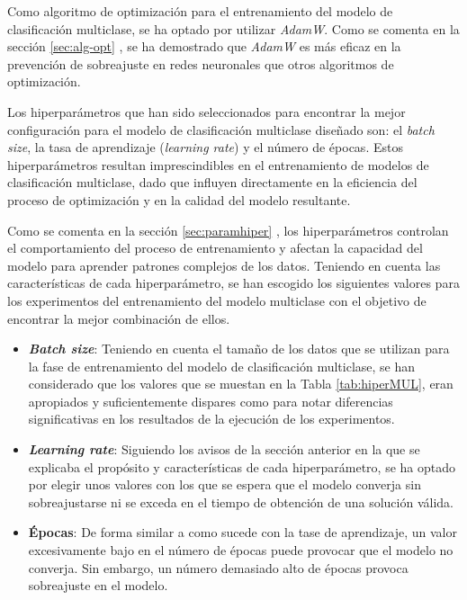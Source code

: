 Como algoritmo de optimización para el entrenamiento del modelo de clasificación multiclase, se ha optado por utilizar \textit{AdamW}. Como se comenta en la sección \ref{sec:alg-opt} , se ha demostrado que \textit{AdamW} es más eficaz en la prevención de sobreajuste en redes neuronales que otros algoritmos de optimización.

Los hiperparámetros que han sido seleccionados para encontrar la mejor configuración para el modelo de clasificación multiclase diseñado son: el \textit{batch size}, la tasa de aprendizaje (\textit{learning rate}) y el número de épocas. Estos hiperparámetros resultan imprescindibles en el entrenamiento de modelos de clasificación multiclase, dado que influyen directamente en la eficiencia del proceso de optimización y en la calidad del modelo resultante.

Como se comenta en la sección \ref{sec:paramhiper} , los hiperparámetros controlan el comportamiento del proceso de entrenamiento y afectan la capacidad del modelo para aprender patrones complejos de los datos. Teniendo en cuenta las características de cada hiperparámetro, se han escogido los siguientes valores para los experimentos del entrenamiento del modelo multiclase con el objetivo de encontrar la mejor combinación de ellos.

\begin{itemize}
	\item \textbf{\textit{Batch size}}: Teniendo en cuenta el tamaño de los datos que se utilizan para la fase de entrenamiento del modelo de clasificación multiclase, se han considerado que los valores que se muestan en la Tabla \ref{tab:hiperMUL}, eran apropiados y suficientemente dispares como para notar diferencias significativas en los resultados de la ejecución de los experimentos.
	\item \textbf{\textit{Learning rate}}: Siguiendo los avisos de la sección anterior en la que se explicaba el propósito y características de cada hiperparámetro, se ha optado por elegir unos valores con los que se espera que el modelo converja sin sobreajustarse ni se exceda en el tiempo de obtención de una solución válida.
	\item \textbf{Épocas}: De forma similar a como sucede con la tase de aprendizaje, un valor excesivamente bajo en el número de épocas puede provocar que el modelo no converja. Sin embargo, un número demasiado alto de épocas provoca sobreajuste en el modelo.
\end{itemize}

